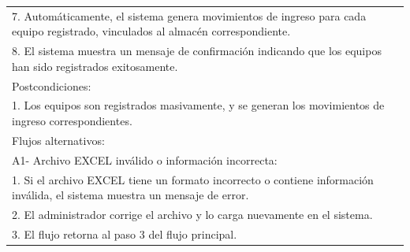 \documentclass[stu, 12pt, letterpaper, donotrepeattitle, floatsintext, natbib]{apa7}
\begin{document}
\begin{longtable}{@{} p{16.5cm} @{}}
    7. Autom\'aticamente, el sistema genera movimientos de ingreso para cada equipo registrado, vinculados al almac\'en correspondiente.                                            \\
    8. El sistema muestra un mensaje de confirmaci\'on indicando que los equipos han sido registrados exitosamente.                                                                 \\ \midrule
    Postcondiciones:                                                                                                                                                                \\
    1. Los equipos son registrados masivamente, y se generan los movimientos de ingreso correspondientes.                                                                           \\ \midrule
    Flujos alternativos:                                                                                                                                                            \\
    A1- Archivo EXCEL inv\'alido o informaci\'on incorrecta:                                                                                                                        \\
    \hspace{1cm}1. Si el archivo EXCEL tiene un formato incorrecto o contiene informaci\'on inv\'alida, el sistema muestra un mensaje de error.                                     \\
    \hspace{1cm}2. El administrador corrige el archivo y lo carga nuevamente en el sistema.                                                                                         \\
    \hspace{1cm}3. El flujo retorna al paso 3 del flujo principal.                                                                                                                  \\ \bottomrule
\end{longtable}
\newpage
\end{document}
